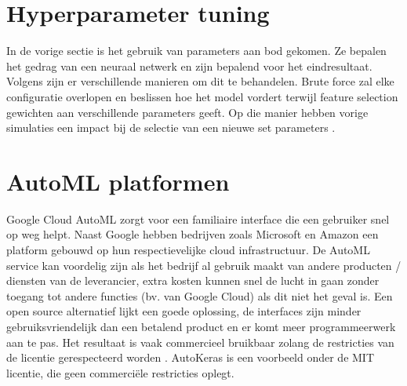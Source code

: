 \section{Hyperparameter tuning}

In de vorige sectie is het gebruik van parameters aan bod gekomen. Ze bepalen het gedrag van een neuraal netwerk en zijn bepalend voor het eindresultaat. Volgens \textcite{Brust2019} zijn er verschillende manieren om dit te behandelen. Brute force zal elke configuratie overlopen en beslissen hoe het model vordert terwijl feature selection gewichten aan verschillende parameters geeft. Op die manier hebben vorige simulaties een impact bij de selectie van een nieuwe set parameters \autocite{Claesen2015}.

\section{AutoML platformen}

Google Cloud AutoML zorgt voor een familiaire interface die een gebruiker snel op weg helpt. Naast Google hebben bedrijven zoals Microsoft en Amazon een platform gebouwd op hun respectievelijke cloud infrastructuur. De AutoML service kan voordelig zijn als het bedrijf al gebruik maakt van andere producten / diensten van de leverancier, extra kosten kunnen snel de lucht in gaan zonder toegang tot andere functies (bv. van Google Cloud) als dit niet het geval is. Een open source alternatief lijkt een goede oplossing, de interfaces zijn minder gebruiksvriendelijk dan een betalend product en er komt meer programmeerwerk aan te pas. Het resultaat is vaak commercieel bruikbaar zolang de restricties van de licentie gerespecteerd worden \autocite{Balter2015}. AutoKeras is een voorbeeld onder de MIT licentie, die geen commerciële restricties oplegt.
